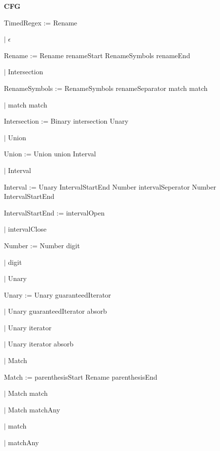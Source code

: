 
\textbf{CFG}

TimedRegex := Rename

\qquad	$\mid$ $\epsilon$

Rename := Rename renameStart RenameSymbols renameEnd

\qquad $\mid$ Intersection

RenameSymbols := RenameSymbols renameSeparator match match

\qquad $\mid$ match match

Intersection := Binary intersection Unary

\qquad $\mid$ Union

Union := Union union Interval

\qquad $\mid$ Interval

Interval := Unary IntervalStartEnd Number intervalSeperator Number IntervalStartEnd

IntervalStartEnd := intervalOpen

\qquad $\mid$ intervalClose

Number := Number digit

\qquad $\mid$ digit

\qquad $\mid$ Unary

Unary := Unary guaranteedIterator

\qquad $\mid$ Unary guaranteedIterator absorb

\qquad $\mid$ Unary iterator

\qquad $\mid$ Unary iterator absorb

\qquad $\mid$ Match

Match := parenthesisStart Rename parenthesisEnd

\qquad $\mid$ Match match

\qquad $\mid$ Match matchAny

\qquad $\mid$ match

\qquad $\mid$ matchAny

